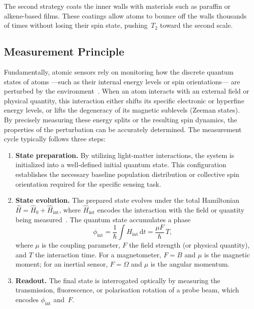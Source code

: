 The second strategy coats the inner walls with materials such as
paraffin or alkene-based films. These coatings allow atoms to
bounce off the walls thousands of times without losing their spin
state, pushing~$T_2$ toward the second scale.

\subsection{Measurement Principle}
\label{sec:measurement_principle}
Fundamentally, atomic sensors rely on monitoring how the discrete quantum 
states of atoms ---such as their internal energy levels or spin 
orientations--- are perturbed by the environment~\cite{kitching2011}. 
When an atom interacts with an external field or physical quantity, this 
interaction either shifts its specific electronic or hyperfine energy 
levels, or lifts the degeneracy of its magnetic sublevels (Zeeman states). 
By precisely measuring these energy splits or the resulting spin dynamics, 
the properties of the perturbation can be accurately determined. 
The measurement cycle typically follows three steps:

\begin{enumerate}
    \item \textbf{State preparation.}
          By utilizing light-matter interactions, the system is initialized 
          into a well-defined initial quantum state. This configuration 
          establishes the necessary baseline population distribution or collective 
          spin orientation required for the specific sensing task.
    \item \textbf{State evolution.}
          The prepared state evolves under the total Hamiltonian
          $\hat{H} = \hat{H}_0 + \hat{H}_\text{int}$, where
          $\hat{H}_\text{int}$ encodes the interaction with the
          field or quantity being measured~\cite{brown2025}. The quantum
          state accumulates a phase
          \begin{equation}
              \phi_\text{int} = \frac{1}{\hbar}
                  \int H_\text{int}\,\mathrm{d}t
                  = \frac{\mu F}{\hbar}\,T,
              \label{eq:phase}
          \end{equation}
          where $\mu$ is the coupling parameter, $F$ the field
          strength (or physical quantity), and $T$ the interaction time. For a
          magnetometer, $F = B$ and $\mu$ is the magnetic
          moment; for an inertial sensor, $F = \Omega$ and
          $\mu$ is the angular momentum.
    \item \textbf{Readout.}
          The final state is interrogated optically by measuring
          the transmission, fluorescence, or polarisation rotation
          of a probe beam, which encodes $\phi_\text{int}$
          and~$F$.
\end{enumerate}
